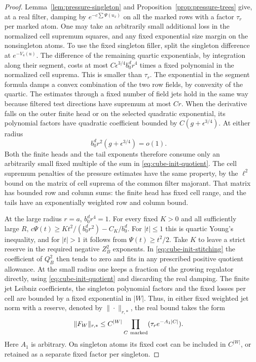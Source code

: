 \documentclass[11pt]{article}
\theoremstyle{definition}
\begin{document}
\begin{proof}
Lemma~\ref{lem:pressure-singleton} and Proposition~\ref{prop:pressure-trees}
give, at a real filter, damping by \(e^{-c\sum\Psi(u_x)}\)
on all the marked rows with a factor \(\tau_r\) per marked atom.
One may take an arbitrarily small additional loss in the
normalized cell supremum squares, and any fixed exponential size
margin on the nonsingleton atoms. To use the fixed singleton
filler, split the singleton difference at \(e^{-V_4(u)}\).
The difference of the remaining quartic exponentials, by
integration along their segment, costs at most
\(C\epsilon^{3/4}b_0^d r^4\) times a fixed polynomial in the
normalized cell suprema. This is smaller than \(\tau_r\).
The exponential in the segment formula damps a convex
combination of the two row fields, by convexity of the quartic.
The estimates through a fixed number of field jets hold in the
same way because filtered test directions have supremum at most
\(Cr\). When the derivative falls on the outer finite head or on
the selected quadratic exponential, its polynomial factors
have quadratic coefficient bounded by \(C(g+\epsilon^{3/4})\).
At either radius
\begin{equation}
 b_0^d r^2(g+\epsilon^{3/4})=o(1).
 \label{eq:cube-initial-quad-small}
\end{equation}
Both the finite heads and the tail exponents therefore consume
only an arbitrarily small fixed multiple of the sum in
\eqref{eq:cube-init-quotient}. The cell supremum penalties of
the pressure estimates have the same property, by the
\(\ell^2\) bound on the matrix of cell suprema of the common
filter majorant. That matrix has bounded row and column sums:
the finite head has fixed cell range, and the tails have an
exponentially weighted row and column bound.

At the large radius \(r=a\), \(b_0^d r^4=1\).
For every fixed \(K>0\) and all sufficiently large \(R\),
\(c\Psi(t)\ge K t^2/(b_0^d r^2)-C_K/b_0^d\). For \(|t|\le1\)
this is quartic Young's inequality, and for \(|t|>1\) it
follows from \(\Psi(t)\ge t^2/2\). Take \(K\) to leave a
strict reserve in the required negative \(Z_B^2\) exponents.
In \eqref{eq:cube-init-stitching} the coefficient of \(Q_B^2\)
then tends to zero and fits in any prescribed positive quotient
allowance. At the small radius one keeps a fraction of the growing
regulator directly, using \eqref{eq:cube-init-quotient} and
discarding the real damping. The finite jet Leibniz coefficients,
the singleton polynomial factors and the fixed losses per cell
are bounded by a fixed exponential in \(|W|\). Thus, in either
fixed weighted jet norm with a reserve, denoted by \(\|\cdot\|_{r,*}\),
the real bound takes the form
\begin{equation}
 \|F_W\|_{r,*}\le C^{|W|}
        \prod_{C\ {\rm marked}}(\tau_r e^{-A_1|C|}).
 \label{eq:cube-init-real-packing}
\end{equation}
Here \(A_1\) is arbitrary. On singleton atoms its fixed cost
can be included in \(C^{|W|}\), or retained as a separate
fixed factor per singleton.


\end{proof}
\end{document}
